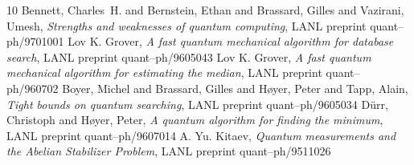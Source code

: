                \begin{thebibliography}{10}
                  Bennett, Charles~H. and Bernstein, Ethan and 
                  Brassard, Gilles and Vazirani, Umesh, 
                  {\em Strengths and weaknesses of quantum computing}, LANL preprint quant--ph/9701001
                   Lov K. Grover, {\em A fast quantum mechanical algorithm for database search}, 
                   LANL preprint quant--ph/9605043
                   Lov K. Grover, {\em A fast quantum mechanical algorithm for estimating the median}, 
                   LANL preprint quant--ph/960702
                   Boyer, Michel and Brassard, Gilles and H{\o}yer,
                   Peter and Tapp, Alain,
                   {\em Tight bounds on quantum searching}, LANL preprint quant--ph/9605034
                   D{\"u}rr, Christoph and H{\o}yer, Peter,
                   {\em A quantum algorithm for finding the minimum}, LANL preprint quant--ph/9607014
                   A. Yu. Kitaev, {\em Quantum measurements and the Abelian Stabilizer Problem}, LANL preprint quant--ph/9511026
               \end{thebibliography}

 
 
 
 
 
 
 
 
 
 
 
 
 

